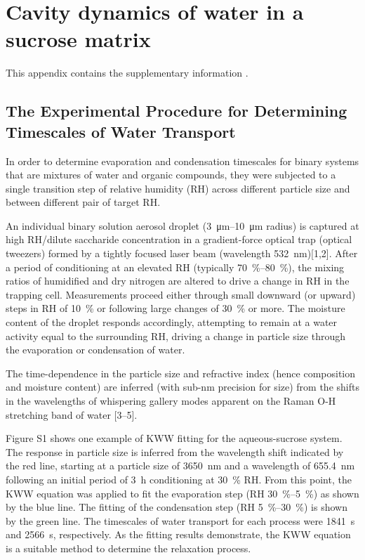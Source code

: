 %
%

\chapter{Cavity dynamics of water in a sucrose matrix}\label{app:wat}
This appendix contains the supplementary information  \cite{songTransientCavityDynamics2020a}. 

\section{The Experimental Procedure for Determining Timescales of Water Transport}

In order to determine evaporation and condensation timescales for binary systems that are mixtures of water and organic compounds, they were subjected to a single transition step of relative humidity (RH) across different particle size and between different pair of target RH. 

An individual binary solution aerosol droplet (\SIrange[range-phrase=-]{3}{10}{\micro\meter} radius) is captured at high RH/dilute saccharide concentration in a gradient-force optical trap (optical tweezers) formed by a tightly focused laser beam (wavelength \SI{532}{\nano\meter})[1,2]. After a period of conditioning at an elevated RH (typically \SIrange[range-phrase=-]{70}{80}{\percent}), the mixing ratios of humidified and dry nitrogen are altered to drive a change in RH in the trapping cell. Measurements proceed either through small downward (or upward) steps in RH of \SI{10}{\percent} or following large changes of \SI{30}{\percent} or more. The moisture content of the droplet responds accordingly, attempting to remain at a water activity equal to the surrounding RH, driving a change in particle size through the evaporation or condensation of water. 

The time-dependence in the particle size and refractive index (hence composition and moisture content) are inferred (with sub-nm precision for size) from the shifts in the wavelengths of whispering gallery modes apparent on the Raman O-H stretching band of water [3–5]. 

Figure S1 shows one example of KWW fitting for the aqueous-sucrose system. The response in particle size is inferred from the wavelength shift indicated by the red line, starting at a particle size of \SI{3650}{\nano\meter} and a wavelength of \SI{655.4}{\nano\meter} following an initial period of \SI{3}{\hour} conditioning at \SI{30}{\percent} RH. From this point, the KWW equation was applied to fit the evaporation step (RH \SIrange{30}{5}{\percent}) as shown by the blue line. The fitting of the condensation step (RH \SIrange{5}{30}{\percent}) is shown by the green line. The timescales of water transport for each process were \SI{1841}{\second} and \SI{2566}{\second}, respectively. As the fitting results demonstrate, the KWW equation is a suitable method to determine the relaxation process. 

